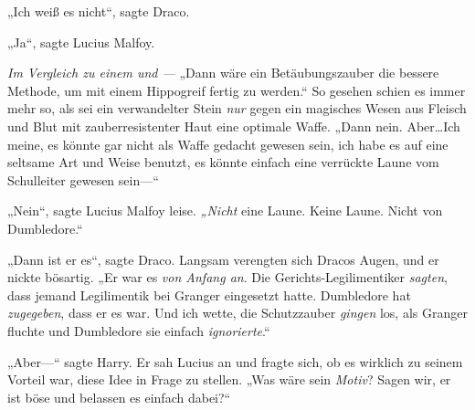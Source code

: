 „Ich weiß es nicht“, sagte Draco.

„Ja“, sagte Lucius Malfoy.

\emph{Im Vergleich zu einem  und —}
„Dann wäre ein Betäubungszauber die bessere Methode, um mit einem Hippogreif fertig zu werden.“
So gesehen schien es immer mehr so, als sei ein verwandelter Stein \emph{nur} gegen ein magisches Wesen aus Fleisch und Blut mit zauberresistenter Haut eine optimale Waffe.
„Dann nein. Aber…Ich meine, es könnte gar nicht als Waffe gedacht gewesen sein, ich habe es auf eine seltsame Art und Weise benutzt, es könnte einfach eine verrückte Laune vom Schulleiter gewesen sein—“

„Nein“, sagte Lucius Malfoy leise. \emph{„Nicht} eine Laune. Keine Laune. Nicht von Dumbledore.“

„Dann ist er es“, sagte Draco.
Langsam verengten sich Dracos Augen, und er nickte bösartig.
„Er war es \emph{von Anfang an}. Die Gerichts-Legilimentiker \emph{sagten}, dass jemand Legilimentik bei Granger eingesetzt hatte. Dumbledore hat \emph{zugegeben}, dass er es war. Und ich wette, die Schutzzauber \emph{gingen} los, als Granger fluchte und Dumbledore sie einfach \emph{ignorierte}.“

„Aber—“ sagte Harry. Er sah Lucius an und fragte sich, ob es wirklich zu seinem Vorteil war, diese Idee in Frage zu stellen.
„Was wäre sein \emph{Motiv}? Sagen wir, er ist böse und belassen es einfach dabei?“

